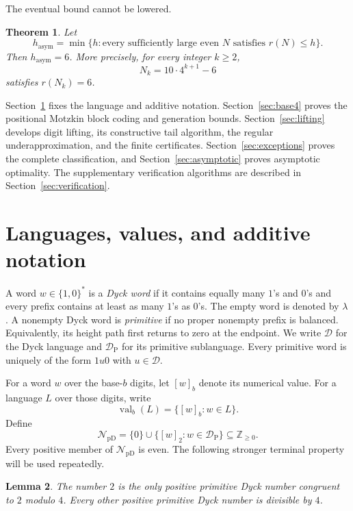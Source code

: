 \documentclass[11pt]{article}
\theoremstyle{plain}
\newtheorem{theorem}{Theorem}
\newtheorem{lemma}[theorem]{Lemma}
\theoremstyle{definition}
\newcommand{\val}[2]{[#1]_{#2}}
\newcommand{\NpD}{\mathcal{N}_{\mathrm{pD}}}
\newcommand{\Dyck}{\mathcal{D}}
\newcommand{\DP}{\mathcal{D}_{\mathrm{P}}}
\begin{document}
The eventual bound cannot be lowered.

\begin{theorem}\label{thm:asymptotic-order}
Let
\[
 h_{\mathrm{asym}}
 =\min\{h:\text{every sufficiently large even }N
              \text{ satisfies }r(N)\leq h\}.
\]
Then $h_{\mathrm{asym}}=6$.  More precisely, for every integer $k\geq2$,
\[
 N_k=10\cdot4^{k+1}-6
\]
satisfies $r(N_k)=6$.
\end{theorem}

Section~\ref{sec:preliminaries} fixes the language and additive notation.
Section~\ref{sec:base4} proves the positional Motzkin block coding and
generation bounds.  Section~\ref{sec:lifting} develops digit lifting, its
constructive tail algorithm, the regular underapproximation, and the finite
certificates.  Section~\ref{sec:exceptions}
proves the complete classification, and Section~\ref{sec:asymptotic}
proves asymptotic optimality.  The supplementary verification algorithms
are described in Section~\ref{sec:verification}.

\section{Languages, values, and additive notation}\label{sec:preliminaries}

A word $w\in\{1,0\}^*$ is a \emph{Dyck word} if it contains equally many
$1$'s and $0$'s and every prefix contains at least as many $1$'s as
$0$'s.  The empty word is denoted by $\lambda$.  A nonempty Dyck word is
\emph{primitive} if no proper nonempty prefix is balanced.  Equivalently,
its height path first returns to zero at the endpoint.  We write $\Dyck$
for the Dyck language and $\DP$ for its primitive sublanguage.  Every
primitive word is uniquely of the form $1u0$ with $u\in\Dyck$.

For a word $w$ over the base-$b$ digits, let $\val{w}{b}$ denote its
numerical value.  For a language $L$ over those digits, write
\[
 \operatorname{val}_b(L)=\{\val{w}{b}:w\in L\}.
\]
Define
\[
 \NpD=\{0\}\cup\{\val{w}{2}:w\in\DP\}
 \subseteq\mathbb Z_{\geq0}.
\]
Every positive member of $\NpD$ is even.  The following stronger terminal
property will be used repeatedly.

\begin{lemma}\label{lem:mod4}
The number $2$ is the only positive primitive Dyck number congruent to
$2$ modulo $4$.  Every other positive primitive Dyck number is divisible
by $4$.
\end{lemma}
\end{document}
